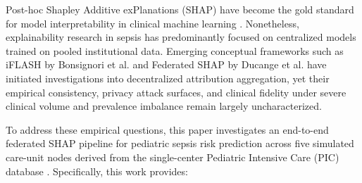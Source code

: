 \documentclass[sigconf,review,anonymous]{acmart}
\begin{document}
Post-hoc Shapley Additive exPlanations (SHAP) \cite{lundberg2017shap} have become the gold standard for model interpretability in clinical machine learning \cite{athukorala2026explainable,chanci2025machine}. Nonetheless, explainability research in sepsis has predominantly focused on centralized models trained on pooled institutional data. Emerging conceptual frameworks such as iFLASH by Bonsignori et al. \cite{bonsignori2026interpreting} and Federated SHAP by Ducange et al. \cite{ducange2026federated} have initiated investigations into decentralized attribution aggregation, yet their empirical consistency, privacy attack surfaces, and clinical fidelity under severe clinical volume and prevalence imbalance remain largely uncharacterized.

To address these empirical questions, this paper investigates an end-to-end federated SHAP pipeline for pediatric sepsis risk prediction across five simulated care-unit nodes derived from the single-center Pediatric Intensive Care (PIC) database \cite{zeng2020pic}. Specifically, this work provides:
\end{document}
